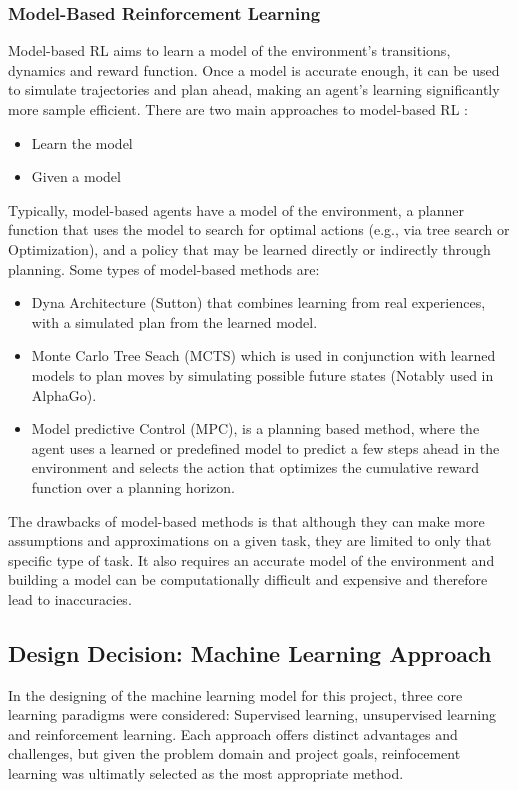 \subsubsection{Model-Based Reinforcement Learning}
Model-based RL aims to learn a model of the environment's transitions, dynamics %
and reward function. Once a model is accurate enough, it can be used to 
simulate trajectories and plan ahead, making an agent's learning significantly more
sample efficient. There are two main approaches to model-based RL \cite{ReinforcementLearning}:
\begin{itemize}
      \item Learn the model %
      \item Given a model
\end{itemize}
Typically, model-based agents have a model of the environment, a planner function that uses
the model to search for optimal actions (e.g., via tree search or Optimization), and a policy
that may be learned directly or indirectly through planning.
Some types of model-based methods are:
\begin{itemize}
      \item Dyna Architecture (Sutton) that combines learning from real experiences, 
      with a simulated plan from the learned model.
      \item Monte Carlo Tree Seach (MCTS) which is used in conjunction with learned models
      to plan moves by simulating possible future states (Notably used in AlphaGo). \cite{ReinforcementLearning}
      \item Model predictive Control (MPC), is a planning based method, where the agent
      uses a learned or predefined model to predict a few steps ahead in the environment and 
      selects the action that optimizes the cumulative reward function over a planning horizon. \cite{Types-of-Reinforcement-Learning} 
\end{itemize}
The drawbacks of model-based methods is that although they can make more assumptions
and approximations on a given task, they are limited to only that specific 
type of task. It also requires an accurate model of the environment and building a model
can be computationally difficult and expensive and therefore lead to inaccuracies. \cite{Types-of-Reinforcement-Learning}

\subsection{Design Decision: Machine Learning Approach}
\label{sec:ML-Design-Decision}
In the designing of the machine learning model for this project, three core learning paradigms
were considered: Supervised learning, unsupervised learning and reinforcement learning. Each 
approach offers distinct advantages and challenges, but given the problem domain and 
project goals, reinfocement learning was ultimatly selected as the most appropriate method.

